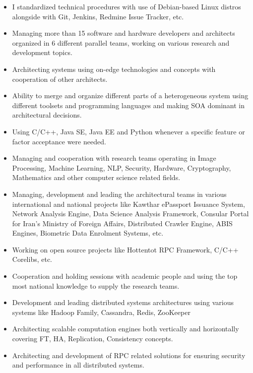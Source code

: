 \documentclass[10pt,a4paper]{article}
\begin{document}
  \begin{itemize}
    \setlength{\rightskip}{2cm}
    \setlength\itemsep{0em}
    \item I standardized technical procedures with use of Debian-based Linux distros alongside with Git, Jenkins, Redmine Issue Tracker, etc.
    \item Managing more than 15 software and hardware developers and architects organized in 6 different parallel teams, working on various research and development topics.
    \item Architecting systems using on-edge technologies and concepts with cooperation of other architects.
    \item Ability to merge and organize different parts of a heterogeneous system using different toolsets and programming languages and making SOA dominant in architectural decisions.
    \item Using C/C++, Java SE, Java EE and Python whenever a specific feature or factor acceptance were needed.
    \item Managing and cooperation with research teams operating in Image Processing, Machine Learning, NLP, Security, Hardware, Cryptography, Mathematics and other computer science related fields.
    \item Managing, development and leading the architectural teams in various international and national projects like Kawthar ePassport Issuance System, Network Analysis Engine, Data Science Analysis Framework, Consular Portal for Iran's Ministry of Foreign Affairs, Distributed Crawler Engine, ABIS Engines, Biometric Data Enrolment Systems, etc.
    \item Working on open source projects like Hottentot RPC Framework, C/C++ Corelibs, etc.
    \item Cooperation and holding sessions with academic people and using the top most national knowledge to supply the research teams.
    \item Development and leading distributed systems architectures using various systems like Hadoop Family, Cassandra, Redis, ZooKeeper
    \item Architecting scalable computation engines both vertically and horizontally covering FT, HA, Replication, Consistency  concepts.
    \item Architecting and development of RPC related solutions for ensuring security and performance in all distributed systems.
  \end{itemize}
  \setlength{\leftskip}{0pt}
  \setlength{\rightskip}{0cm}
	  
\end{document}
